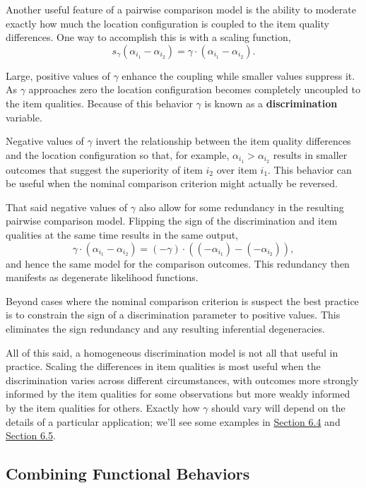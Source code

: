 \documentclass[
  letterpaper,
  DIV=11,
  numbers=noendperiod]{scrartcl}
\begin{document}
Another useful feature of a pairwise comparison model is the ability to
moderate exactly how much the location configuration is coupled to the
item quality differences. One way to accomplish this is with a scaling
function, \[
s_{\gamma}(\alpha_{i_{1}} - \alpha_{i_{2}})
=
\gamma \cdot (\alpha_{i_{1}} - \alpha_{i_{2}}).
\]

Large, positive values of \(\gamma\) enhance the coupling while smaller
values suppress it. As \(\gamma\) approaches zero the location
configuration becomes completely uncoupled to the item qualities.
Because of this behavior \(\gamma\) is known as a
\textbf{discrimination} variable.

Negative values of \(\gamma\) invert the relationship between the item
quality differences and the location configuration so that, for example,
\(\alpha_{i_{1}} > \alpha_{i_{2}}\) results in smaller outcomes that
suggest the superiority of item \(i_{2}\) over item \(i_{1}\). This
behavior can be useful when the nominal comparison criterion might
actually be reversed.

That said negative values of \(\gamma\) also allow for some redundancy
in the resulting pairwise comparison model. Flipping the sign of the
discrimination and item qualities at the same time results in the same
output, \[
\gamma \cdot (\alpha_{i_{1}} - \alpha_{i_{2}})
=
(-\gamma) \cdot ( (-\alpha_{i_{1}}) - (-\alpha_{i_{2}})),
\] and hence the same model for the comparison outcomes. This redundancy
then manifests as degenerate likelihood functions.

Beyond cases where the nominal comparison criterion is suspect the best
practice is to constrain the sign of a discrimination parameter to
positive values. This eliminates the sign redundancy and any resulting
inferential degeneracies.

All of this said, a homogeneous discrimination model is not all that
useful in practice. Scaling the differences in item qualities is most
useful when the discrimination varies across different circumstances,
with outcomes more strongly informed by the item qualities for some
observations but more weakly informed by the item qualities for others.
Exactly how \(\gamma\) should vary will depend on the details of a
particular application; we'll see some examples in
\hyperref[sec:demo-irt]{Section 6.4} and
\hyperref[sec:demo-league]{Section 6.5}.

\subsection{Combining Functional
Behaviors}\label{combining-functional-behaviors}
\end{document}
